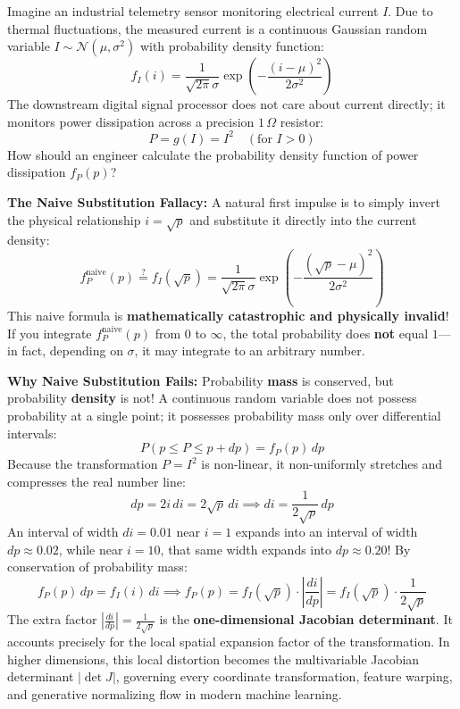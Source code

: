 Imagine an industrial telemetry sensor monitoring electrical current $I$. Due to thermal fluctuations, the measured current is a continuous Gaussian random variable $I \sim \mathcal{N}(\mu, \sigma^2)$ with probability density function:
\begin{equation}
f_I(i) = \frac{1}{\sqrt{2\pi}\sigma} \exp\left( -\frac{(i - \mu)^2}{2\sigma^2} \right)
\end{equation}
The downstream digital signal processor does not care about current directly; it monitors power dissipation across a precision $1\,\Omega$ resistor:
\begin{equation}
P = g(I) = I^2 \quad (\text{for } I > 0)
\end{equation}
How should an engineer calculate the probability density function of power dissipation $f_P(p)$?

\textbf{The Naive Substitution Fallacy:} A natural first impulse is to simply invert the physical relationship $i = \sqrt{p}$ and substitute it directly into the current density:
\begin{equation}
f_P^{\text{naive}}(p) \stackrel{?}{=} f_I(\sqrt{p}) = \frac{1}{\sqrt{2\pi}\sigma} \exp\left( -\frac{(\sqrt{p} - \mu)^2}{2\sigma^2} \right)
\label{eq:naive_density_fallacy}
\end{equation}
This naive formula is \textbf{mathematically catastrophic and physically invalid}! If you integrate $f_P^{\text{naive}}(p)$ from $0$ to $\infty$, the total probability does \textbf{not} equal $1$---in fact, depending on $\sigma$, it may integrate to an arbitrary number.

\textbf{Why Naive Substitution Fails:} Probability \textbf{mass} is conserved, but probability \textbf{density} is not! 
A continuous random variable does not possess probability at a single point; it possesses probability mass only over differential intervals:
\begin{equation}
P(p \le P \le p + dp) = f_P(p) \, dp
\end{equation}
Because the transformation $P = I^2$ is non-linear, it non-uniformly stretches and compresses the real number line:
\begin{equation}
dp = 2i \, di = 2\sqrt{p} \, di \implies di = \frac{1}{2\sqrt{p}} \, dp
\end{equation}
An interval of width $di = 0.01$ near $i = 1$ expands into an interval of width $dp \approx 0.02$, while near $i = 10$, that same width expands into $dp \approx 0.20$! By conservation of probability mass:
\begin{equation}
f_P(p) \, dp = f_I(i) \, di \implies f_P(p) = f_I(\sqrt{p}) \cdot \left| \frac{di}{dp} \right| = f_I(\sqrt{p}) \cdot \frac{1}{2\sqrt{p}}
\end{equation}
The extra factor $\left|\frac{di}{dp}\right| = \frac{1}{2\sqrt{p}}$ is the \textbf{one-dimensional Jacobian determinant}. It accounts precisely for the local spatial expansion factor of the transformation. In higher dimensions, this local distortion becomes the multivariable Jacobian determinant $|\det J|$, governing every coordinate transformation, feature warping, and generative normalizing flow in modern machine learning.

